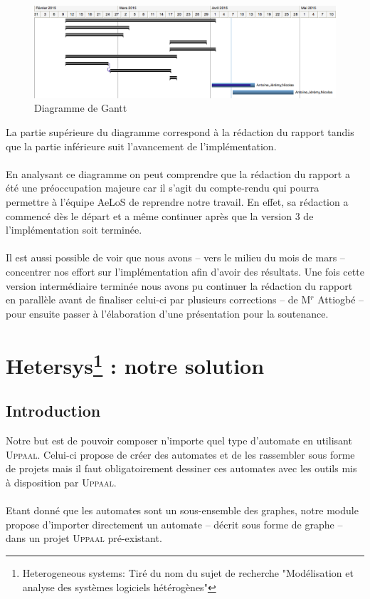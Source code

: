 \documentclass[12pt,a4paper]{report}
\begin{document}
\begin{figure}[!h]
  \centering
  \includegraphics[scale=0.4]{ressources/gantt.png}
  \caption{Diagramme de Gantt}
\end{figure}

La partie supérieure du diagramme correspond à la rédaction du rapport
tandis que la partie inférieure suit l'avancement de l'implémentation.
\\\\
En analysant ce diagramme on peut comprendre que la rédaction du rapport a été
une préoccupation majeure car il s'agit du compte-rendu qui pourra permettre 
à l'équipe AeLoS de reprendre notre travail. En effet, sa rédaction a commencé dès
le départ et a même continuer après que la version 3 de l'implémentation soit terminée.
\\\\
Il est aussi possible de voir que nous avons -- vers le milieu du mois de mars -- concentrer
nos effort sur l'implémentation afin d'avoir des résultats. Une fois cette version intermédiaire
terminée nous avons pu continuer la rédaction du rapport en parallèle avant de 
finaliser celui-ci par plusieurs corrections -- de M$^r$ Attiogbé -- pour ensuite passer à l'élaboration 
d'une présentation pour la soutenance.


\newpage
\chapter[Hetersys : notre solution]{Hetersys\footnote{Heterogeneous systems: Tiré du nom du sujet de recherche "Modélisation et analyse des systèmes logiciels hétérogènes"} : notre solution}
\section{Introduction}

Notre but est de pouvoir composer n'importe quel type d'automate en utilisant 
\textsc{Uppaal}. Celui-ci propose de créer des automates et de les rassembler sous forme de projets 
mais il faut obligatoirement dessiner ces automates avec les outils mis à disposition
par \textsc{Uppaal}.
\\\\
Etant donné que les automates sont un sous-ensemble des graphes, notre module propose 
d'importer directement un automate -- décrit sous forme de graphe -- dans un projet 
\textsc{Uppaal} pré-existant. 
\end{document}
